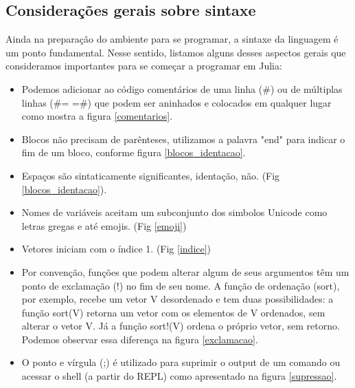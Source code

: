 \subsection{Considerações gerais sobre sintaxe}
Ainda na preparação do ambiente para se programar, a sintaxe da linguagem é um ponto fundamental. Nesse sentido, listamos alguns desses aspectos gerais que consideramos importantes para se começar a programar em Julia: 



\begin{itemize}
    \item Podemos adicionar ao código comentários de uma linha (\#) ou de múltiplas linhas (\#= =\#) que podem ser aninhados e colocados em qualquer lugar como mostra a figura \ref{comentarios}.

    \item Blocos não precisam de parênteses, utilizamos a palavra "end" para indicar o fim de um bloco, conforme figura \ref{blocos_identacao}.
    \item Espaços são sintaticamente significantes, identação, não. (Fig \ref{blocos_identacao}).
    \item Nomes de variáveis aceitam um subconjunto dos simbolos Unicode como letras gregas e até emojis. (Fig \ref{emoji})
    \item Vetores iniciam com o índice 1. (Fig \ref{indice})
    \item Por convenção, funções que podem alterar algum de seus argumentos têm um ponto de exclamação (!) no fim de seu nome. A função de ordenação (sort), por exemplo, recebe um vetor V desordenado e tem duas possibilidades: a função sort(V) retorna um vetor com os elementos de V ordenados, sem alterar o vetor V. Já a função sort!(V) ordena o próprio vetor, sem retorno. Podemos observar essa diferença na figura \ref{exclamacao}.
    \item O ponto e vírgula (;) é utilizado para suprimir o output de um comando ou acessar o shell (a partir do REPL) como apresentado na figura \ref{supressao}.
    
  \end{itemize}
    
